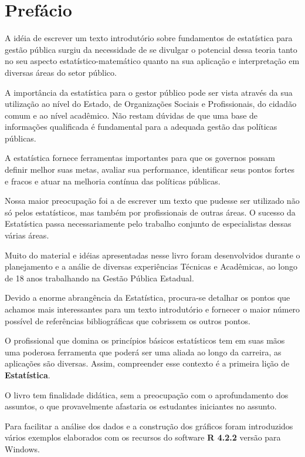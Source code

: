 \chapter*{Prefácio}

\inic A idéia de escrever um texto introdutório sobre fundamentos de estatística para gestão pública surgiu da necessidade de se divulgar o potencial dessa teoria tanto no
seu aspecto estatístico-matemático quanto na sua aplicação e
interpretação em diversas áreas do setor público.\vst

A importância da estatística para o gestor público pode ser vista através da sua utilização ao nível do Estado, de Organizações Sociais e Profissionais, do cidadão comum e ao nível acadêmico. Não restam dúvidas de que uma base de informações qualificada é fundamental para a adequada gestão das políticas públicas.\vst  

A estatística fornece ferramentas importantes para que os governos possam definir melhor suas metas, avaliar sua performance, identificar seus pontos fortes e fracos e atuar na melhoria contínua das políticas públicas.
\vst

Nossa maior preocupação foi a de escrever um texto que pudesse ser
utilizado não só pelos estatísticos, mas também por profissionais de outras áreas. O sucesso da Estatística passa necessariamente
pelo trabalho conjunto de especialistas dessas várias áreas. \vst

Muito do material e idéias apresentadas nesse livro foram
desenvolvidos durante o planejamento e a análie de diversas experiências Técnicas e Acadêmicas, ao longo de 18 anos trabalhando na Gestão Pública Estadual.
\vst 


Devido a enorme abrangência da Estatística, procura-se detalhar os pontos que achamos mais interessantes para um texto introdutório e
fornecer o maior número possível de referências bibliográficas que
cobrissem os outros pontos.\vst

O profissional que domina os princípios básicos estatísticos tem em suas mãos uma poderosa ferramenta que poderá ser uma aliada ao longo da carreira, as aplicações são diversas. Assim, compreender esse contexto é a primeira lição de \textbf{Estatística}.
\vst

\newpage
O livro tem finalidade didática, sem a preocupação com o aprofundamento dos assuntos, o que provavelmente afastaria os estudantes iniciantes no assunto.\vst 

Para facilitar a análise dos dados e a construção dos gráficos foram introduzidos vários exemplos elaborados com os recursos do software \textbf{R 4.2.2} versão para Windows. 
\vst

